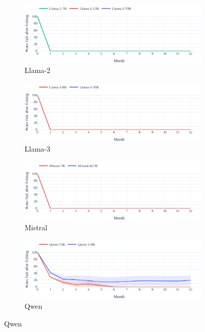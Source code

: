 \documentclass{article}
\begin{document}
\begin{figure}[h]
    \vspace{0.5em}
    \begin{subfigure}{0.49\textwidth}
            \includegraphics[width=\linewidth]{fig/fish/fish-baseline_concurrent-resource_over_time-Llama-2.pdf}
            \caption{Llama-2}
    \end{subfigure}
    \hspace{0.5em}
    \begin{subfigure}{0.49\textwidth}
             \includegraphics[width=\linewidth]{fig/fish/fish-baseline_concurrent-resource_over_time-Llama-3.pdf}
             \caption{Llama-3}
    \end{subfigure}

    \vspace{0.5em}
    \begin{subfigure}{0.49\textwidth}
            \includegraphics[width=\linewidth]{fig/fish/fish-baseline_concurrent-resource_over_time-Mistral.pdf}
            \caption{Mistral}
    \end{subfigure}
    \hspace{0.5em}
    \begin{subfigure}{0.49\textwidth}
             \includegraphics[width=\linewidth]{fig/fish/fish-baseline_concurrent-resource_over_time-Qwen.pdf}
             \caption{Qwen}
    \end{subfigure}
    

\end{figure}
\end{document}
